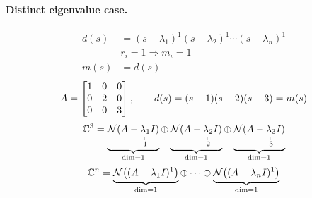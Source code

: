 \paragraph{Distinct eigenvalue case.}
\begin{align*}
d(s)&=(s-\lambda_1)^1(s-\lambda_2)^1\cdots(s-\lambda_n)^1\\
&r_i=1\Rightarrow m_i=1\\
m(s)&=d(s)
\end{align*}
\[
A=\begin{bmatrix}1&0&0\\0&2&0\\0&0&3\end{bmatrix},\qquad d(s)=(s-1)(s-2)(s-3)=m(s)
\]
\[
\mathbb{C}^3=\underbrace{\mathcal{N}(A-\underset{\substack{\shortparallel\\1}}{\lambda_1}I)}_{\dim=1}
\oplus\underbrace{\mathcal{N}(A-\underset{\substack{\shortparallel\\2}}{\lambda_2}I)}_{\dim=1}
\oplus\underbrace{\mathcal{N}(A-\underset{\substack{\shortparallel\\3}}{\lambda_3}I)}_{\dim=1}
\]
\[
\mathbb{C}^n=\underbrace{\mathcal{N}\big((A-\lambda_1I)^1\big)}_{\dim=1}\oplus\cdots\oplus\underbrace{\mathcal{N}\big((A-\lambda_nI)^1\big)}_{\dim=1}
\]

